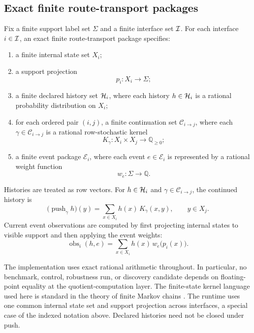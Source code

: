 \documentclass[11pt]{article}
\theoremstyle{definition}
\begin{document}
\subsection{Exact finite route-transport packages}\label{subsec:eff-packages}
Fix a finite support label set $\Sigma$ and a finite interface set $\mathcal{I}$. For each interface $i\in\mathcal{I}$, an exact finite route-transport package specifies:
\begin{enumerate}
\item a finite internal state set $X_i$;
\item a support projection
\[
p_i : X_i \to \Sigma;
\]
\item a finite declared history set $\mathcal{H}_i$, where each history $h\in\mathcal{H}_i$ is a rational probability distribution on $X_i$;
\item for each ordered pair $(i,j)$, a finite continuation set $\mathcal{C}_{i\to j}$, where each $\gamma\in\mathcal{C}_{i\to j}$ is a rational row-stochastic kernel
\[
K_{\gamma} : X_i \times X_j \to \mathbb{Q}_{\ge 0};
\]
\item a finite event package $\mathcal{E}_i$, where each event $e\in\mathcal{E}_i$ is represented by a rational weight function
\[
w_e : \Sigma \to \mathbb{Q}.
\]
\end{enumerate}

Histories are treated as row vectors. For $h\in\mathcal{H}_i$ and $\gamma\in\mathcal{C}_{i\to j}$, the continued history is
\begin{equation}
\bigl(\operatorname{push}_{\gamma} h\bigr)(y)
=
\sum_{x\in X_i} h(x)\,K_{\gamma}(x,y),
\qquad y\in X_j.
\label{eq:finite-push}
\end{equation}
Current event observations are computed by first projecting internal states to visible support and then applying the event weights:
\begin{equation}
\operatorname{obs}_i(h,e)
=
\sum_{x\in X_i} h(x)\,w_e\!\bigl(p_i(x)\bigr).
\label{eq:finite-observation}
\end{equation}

The implementation uses exact rational arithmetic throughout. In particular, no benchmark, control, robustness run, or discovery candidate depends on floating-point equality at the quotient-computation layer.
The finite-state kernel language used here is standard in the theory of finite Markov chains \citep{Norris1998MarkovChains}. The runtime uses one common internal state set and support projection across interfaces, a special case of the indexed notation above. Declared histories need not be closed under push.
\end{document}
